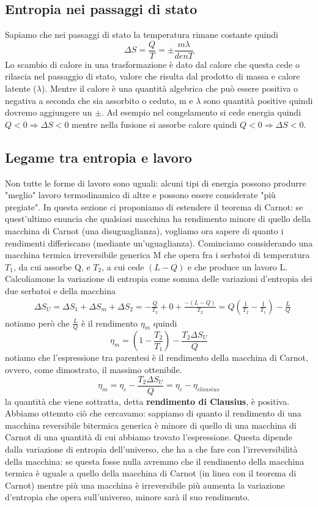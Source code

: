 \documentclass[10pt,a4paper]{article}
\begin{document}
\subsection{Entropia nei passaggi di stato}
Sapiamo che nei passaggi di stato la temperatura rimane costante quindi
\[\Delta S = \frac{Q}{T}=\pm\frac{m\lambda}{denT}\]
Lo scambio di calore in una trasformazione è dato dal calore che questa cede o rilascia nel passaggio di stato, valore che risulta dal prodotto di massa e calore latente ($\lambda$). Mentre il calore è una quantità algebrica che può essere positiva o negativa a seconda che sia assorbito o ceduto, m e $\lambda$ sono quantità positive quindi dovremo aggiungere un $\pm$. Ad esempio nel congelamento si cede energia quindi \(Q<0\Rightarrow \Delta S < 0\) mentre nella fusione si assorbe calore quindi \(Q<0\Rightarrow \Delta S < 0\). 
\subsection{Legame tra entropia e lavoro}
 Non tutte le forme di lavoro sono uguali: alcuni tipi di energia possono produrre "meglio" lavoro termodinamico di altre e possono essere considerate "più pregiate". In questa sezione ci proponiamo di estendere il teorema di Carnot: se quest'ultimo enuncia che qualsiasi macchina ha rendimento minore di quello della macchina di Carnot (una disuguaglianza), vogliamo ora sapere di quanto i rendimenti differiscano (mediante un'uguaglianza). Cominciamo considerando una macchina termica irreversibile generica M che opera fra i serbatoi di temperatura \(T_1\), da cui assorbe Q, e \(T_2\), a cui cede \((L-Q)\) e che produce un lavoro L. Calcoliamone la variazione di entropia come somma delle variazioni d'entropia dei due serbatoi e della macchina
 \begin{align*}
 	&\Delta S_U = \Delta S_1 + \Delta S_m + \Delta S_2 = -\frac{Q}{T_2}+0+\frac{-(L-Q)}{T_2}= Q \left(\frac{1}{T_2}-\frac{1}{T_1}\right)-\frac{L}{Q}
 \end{align*}
notiamo però che $\frac{L}{Q}$ è il rendimento \(\eta_m\) quindi 
\[ \eta_m = \left(1-\frac{T_2}{T_1}\right)-\frac{T_2\Delta S_U}{Q} \]
notiamo che l'espressione tra parentesi è il rendimento della macchina di Carnot, ovvero, come dimostrato, il massimo ottenibile. 
\[ \eta_m = \eta_c-\frac{T_2\Delta S_U}{Q} = \eta_c - \eta_{clausius} \]
la quantità che viene sottratta, detta \textbf{rendimento di Clausius}, è positiva. Abbiamo ottenuto ciò che cercavamo: sappiamo di quanto il rendimento di una macchina reversibile bitermica generica è minore di quello di una macchina di Carnot di una quantità di cui abbiamo trovato l'espressione. Questa dipende dalla variazione di entropia dell'universo, che ha a che fare con l'irreversibilità della macchina: se questa fosse nulla avremmo che il rendimento della macchina termica è uguale a quello della macchina di Carnot (in linea con il teorema di Carnot) mentre più una macchina è irreversibile più aumenta la variazione d'entropia che opera sull'universo, minore sarà il suo rendimento.\\
\end{document}
